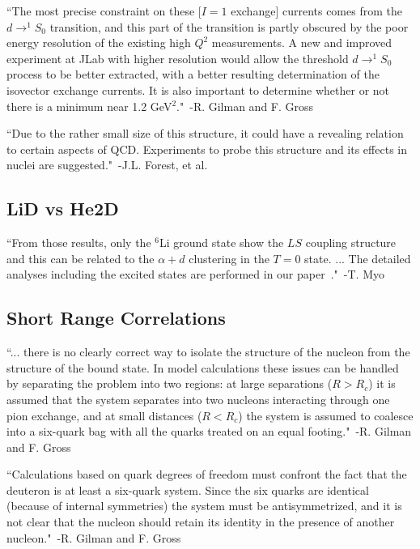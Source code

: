 ``The most precise constraint on these [$I=1$ exchange] currents comes from the $d\rightarrow ^1S_0$ transition, and this part of the transition is partly obscured by the poor energy resolution of the existing high $Q^2$ measurements. A new and improved experiment at JLab with higher resolution would allow the threshold $d\rightarrow ^1S_0$ process to be better extracted, with a better resulting determination of the isovector exchange currents. It is also important to determine whether or not there is a minimum near 1.2 GeV$^2$."~-R. Gilman and F. Gross~\cite{Gilman:2001yh}

``Due to the rather small size of this structure, it could have a revealing relation to certain aspects of QCD. Experiments to probe this structure and its effects in nuclei are suggested."~-J.L. Forest, et al.~\cite{Forest:1996kp}


\subsection{LiD vs He2D}

``From those results, only the $^6$Li ground state show the $LS$ coupling structure and this can be related to the $\alpha + d$ clustering in the $T=0$ state. ... The detailed analyses including the excited states are performed in our paper~\cite{Myo:2012pv}."~-T. Myo~\cite{Myo:2013dya}

\subsection{Short Range Correlations}

``... there is no clearly correct way to isolate the structure of the nucleon from the structure of the bound state. In model calculations these issues can be handled by separating the problem into two regions: at large separations ($R>R_c$) it is assumed that the system separates into two nucleons interacting through one pion exchange, and at small distances ($R<R_c$) the system is assumed to coalesce into a six-quark bag with all the quarks treated on an equal footing."~-R. Gilman and F. Gross~\cite{Gilman:2001yh}


``Calculations based on quark degrees of freedom must confront the fact that the deuteron is at least a six-quark system. Since the six quarks are identical (because of internal symmetries) the system must be antisymmetrized, and it is not clear that the nucleon should retain its identity in the presence of another nucleon."~-R. Gilman and F. Gross~\cite{Gilman:2001yh}


